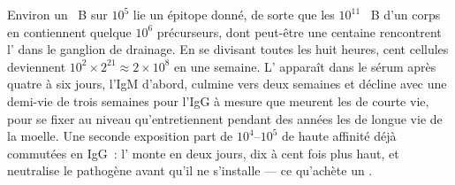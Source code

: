 \begin{example}\label{ex:b3:adaptive-immunity:kinetics}
Environ un ~B sur $10^{5}$ lie un épitope donné, de sorte que
les $10^{11}$ ~B d'un corps en contiennent quelque $10^{6}$
précurseurs, dont peut-être une centaine rencontrent l' dans le
ganglion de drainage. En se divisant toutes les huit heures, cent
cellules deviennent $10^{2}\times 2^{21} \approx 2\times 10^{8}$ en une
semaine. L' apparaît dans le sérum après quatre à six jours,
l'IgM d'abord, culmine vers deux semaines et décline avec une demi-vie
de trois semaines pour l'IgG à mesure que meurent les  de
courte vie, pour se fixer au niveau qu'entretiennent pendant des années
les  de longue vie de la moelle. Une seconde exposition part
de $10^{4}$--$10^{5}$  de haute affinité déjà commutées
en IgG~: l' monte en deux jours, dix à cent fois plus haut, et
neutralise le pathogène avant qu'il ne s'installe --- ce qu'achète un
.
\end{example}

